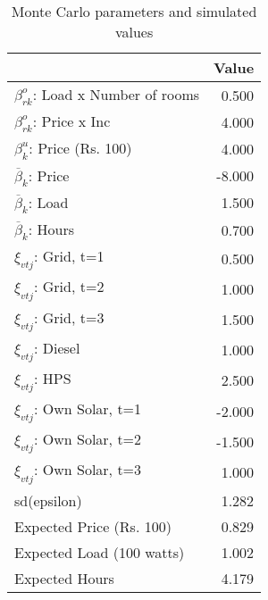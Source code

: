 \begin{table}[!ht]
	\centering
		\caption{Monte Carlo parameters and simulated values}
\begin{tabular}{lr}
		\toprule
               &     Value\\
		\midrule
		$\beta^o_{rk}$: Load x Number of rooms&     0.500\\
		$\beta^o_{rk}$: Price x Inc&     4.000\\
		$\beta^u_{k}$: Price (Rs. 100)&     4.000\\
		$\overline{\beta}_k$: Price&    -8.000\\
		$\overline{\beta}_k$: Load&     1.500\\
		$\overline{\beta}_k$: Hours&     0.700\\
		$\xi_{vtj}$: Grid, t=1&     0.500\\
		$\xi_{vtj}$: Grid, t=2&     1.000\\
		$\xi_{vtj}$: Grid, t=3&     1.500\\
		$\xi_{vtj}$: Diesel&     1.000\\
		$\xi_{vtj}$: HPS&     2.500\\
		$\xi_{vtj}$: Own Solar, t=1&    -2.000\\
		$\xi_{vtj}$: Own Solar, t=2&    -1.500\\
		$\xi_{vtj}$: Own Solar, t=3&     1.000\\
		    sd(epsilon)&     1.282\\
		Expected Price (Rs. 100)&     0.829\\
		Expected Load (100 watts)&     1.002\\
		 Expected Hours&     4.179\\
		\bottomrule
	\end{tabular}
\end{table}
